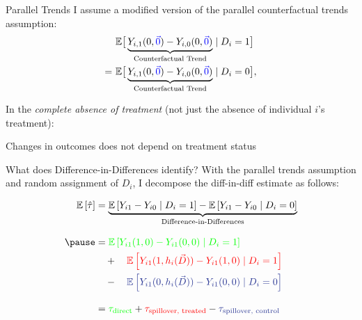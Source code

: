 \documentclass[aspectratio=169]{beamer}
\begin{document}
\begin{frame}{Parallel Trends}
    I assume a modified version of the parallel counterfactual trends assumption: 
    \begin{align*}
        &\mathbb{E}\big[ \underbrace{Y_{i,1}(0, \textcolor{blue}{\vec{0}}) - Y_{i,0}(0, \textcolor{blue}{\vec{0}})}_{\text{Counterfactual Trend}} \mid D_i = 1 \big] \\
        = \ &\mathbb{E}\big[ \underbrace{Y_{i,1}(0, \textcolor{blue}{\vec{0}}) - Y_{i,0}(0, \textcolor{blue}{\vec{0}})}_{\text{Counterfactual Trend}} \mid D_i = 0 \big],
    \end{align*}

    \vspace{5mm}
    In the \textit{complete absence of treatment }(not just the absence of individual $i$'s treatment):
    
    Changes in outcomes does not depend on treatment status
    
\end{frame}

\begin{frame}{What does Difference-in-Differences identify?}
    With the parallel trends assumption and random assignment of $D_i$, I decompose the diff-in-diff estimate as follows: 
        
    \begin{align*}
        \mathbb{E}\left[\hat{\tau}\right] &= \underbrace{\mathbb{E} \left[ Y_{i1} - Y_{i0} \mid D_i = 1 \right] - \mathbb{E} \left[ Y_{i1} - Y_{i0} \mid D_i = 0 \right]}_{\text{Difference-in-Differences}} \\[3mm]
        \pause&= 
        \textcolor{green}{\mathbb{E} \left[ Y_{i1}(1, 0) - Y_{i1}(0, 0) \mid D_i = 1 \right]} \\
        &\quad + \quad 
        \textcolor{red}{\mathbb{E} \left[ Y_{i1}(1, h_i(\vec{D})) - Y_{i1}(1, 0) \mid D_i = 1 \right]} \\ 
        &\quad - \quad  
        \textcolor{purple}{\mathbb{E} \left[ Y_{i1}(0, h_i(\vec{D})) - Y_{i1}(0, 0) \mid D_i = 0 \right]} \\[3mm]
        &= \textcolor{green}{\tau_{\text{direct}}} + \textcolor{red}{\tau_{\text{spillover, treated}}} - \textcolor{purple}{\tau_{\text{spillover, control}}}
    \end{align*}

\end{frame}
\end{document}
